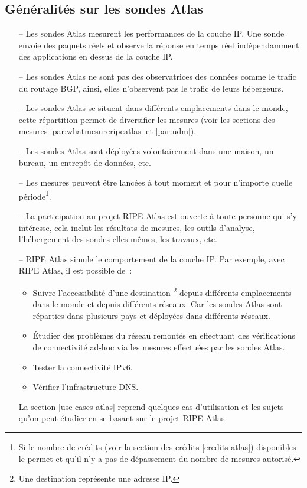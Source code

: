 \subsection{Généralités sur les sondes  Atlas}
\begin{itemize}
	\item[--] Les sondes Atlas  mesurent les performances de la couche IP. Une sonde  envoie des paquets réels et observe la réponse en temps réel indépendamment des applications en dessus de la couche IP.
	
	\item[--] Les sondes Atlas ne sont pas des observatrices des données comme le trafic du routage BGP, ainsi, elles n'observent pas  le trafic de leurs hébergeurs.
	
	\item[--] Les sondes  Atlas se situent dans différents emplacements dans le monde, cette répartition permet de diversifier les mesures (voir les sections des mesures  \ref{par:whatmesureripeatlas} et \ref{par:udm}). 
	
	\item[--] Les sondes Atlas sont déployées volontairement dans une maison, un bureau,  un entrepôt de données, etc.
	
	\item[--] Les mesures peuvent être lancées à tout moment et pour n'importe quelle période\footnote{Si le nombre de crédits (voir la section des crédits \ref{credits-atlas}) disponibles le permet et qu'il n'y a pas de dépassement du nombre de mesures autorisé.}.
	
	\item[--] La participation au projet RIPE Atlas est ouverte à toute personne qui s'y intéresse, cela inclut  les résultats de mesures, les outils d'analyse, l'hébergement des sondes elles-mêmes, les travaux, etc.
	
	\item[--] RIPE Atlas simule le comportement de la couche IP. Par exemple, avec RIPE Atlas, il est possible  de~:
	\begin{itemize}
		\item Suivre l'accessibilité d'une destination \footnote{Une destination représente une adresse IP.} depuis différents emplacements dans le monde et  depuis différents réseaux. Car les sondes Atlas sont réparties dans plusieurs pays et déployées dans différents réseaux.
		
		\item Étudier des problèmes du réseau remontés en effectuant des vérifications de connectivité ad-hoc via les mesures effectuées par les sondes  Atlas.
		
		\item Tester la connectivité IPv6.
		
		\item Vérifier l'infrastructure DNS.
	\end{itemize}
	
	La section  \ref{use-cases-atlas} reprend quelques cas d'utilisation  et les sujets qu'on peut étudier en se basant sur le projet  RIPE Atlas. 
\end{itemize}

